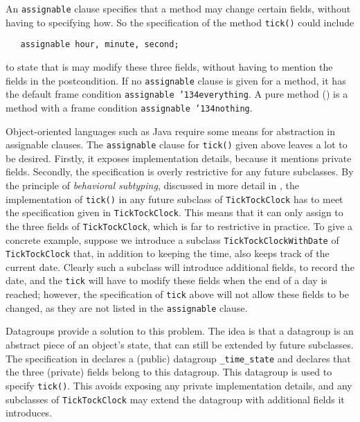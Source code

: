 \documentclass{llncs}
\def\everything{\texttt{\char'134everything}}
\def\nothing{\texttt{\char'134nothing}}
\begin{document}
An \texttt{assignable} clause specifies that a method may change certain 
fields, without having to specifying how.
So the specification of the method \texttt{tick()} could include
\begin{verbatim}
   assignable hour, minute, second;
\end{verbatim}
to state that is may modify these three fields, without having to mention
the fields in the postcondition.
%
If no \texttt{assignable} clause is given for a method, it has the
default frame condition \texttt{assignable \everything}.
%
A pure method () is a method with a frame condition
\texttt{assignable \nothing}.

Object-oriented languages such as Java require some means for abstraction in
assignable clauses.  The \texttt{assignable} clause for \texttt{tick()} given
above leaves a lot to be desired.  Firstly, it exposes implementation
details, because it mentions private fields.  Secondly, the
specification is overly restrictive for any future subclasses.  By the
principle of \emph{behavioral subtyping}, discussed in more detail in
, the implementation of \texttt{tick()} in any
future subclass of \texttt{TickTockClock} has to meet the specification given
in \texttt{TickTockClock}.  This means that it can only assign to the three
fields of \texttt{TickTockClock}, which is far to restrictive in practice.  
%
To give a concrete example, suppose we introduce a subclass
\texttt{Tick\-Tock\-Clock\-With\-Date} of \texttt{TickTockClock} that, in
addition to keeping the time, also keeps track of the current date.  Clearly
such a subclass will introduce additional fields, to record the date, and the
\texttt{tick} will have to modify these fields when the end of a day is
reached; however, the specification of \texttt{tick} above will not allow these
fields to be changed, as they are not listed in the \texttt{assignable} clause.

Datagroups \cite{Leino98} provide a solution to 
this problem. The idea is that a datagroup is an abstract piece of an object's
state, that can still be extended by future subclasses.
The specification in  declares a (public) datagroup
\texttt{\_time\_state} and declares that the three (private) fields belong
to this datagroup. This datagroup is used to specify \texttt{tick()}.
This avoids exposing any private implementation details, and
any subclasses of \texttt{TickTockClock} may extend the datagroup with
additional fields it introduces.
\end{document}
